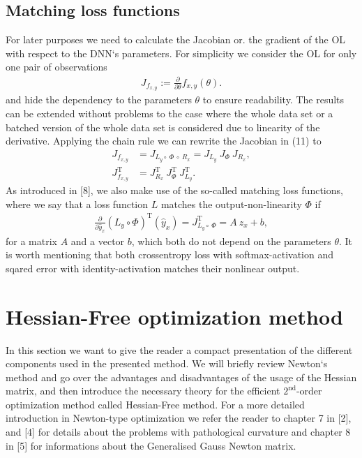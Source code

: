 \documentclass[conference]{IEEEtran}
\begin{document}
\subsection{Matching loss functions}
For later purposes we need to calculate the Jacobian or. the gradient of the OL with respect to the DNN`s parameters. For simplicity we consider the OL for only one pair of observations
\begin{align}
J_{f_{x, y}} := \frac{\partial}{\partial\theta}f_{x, y}(\theta).
\end{align}
and hide the dependency to the parameters $\theta$ to ensure readability.
The results can be extended without problems to the case where the whole data set or a batched version of the whole data set is considered due to linearity of the derivative.
Applying the chain rule we can rewrite the Jacobian in (11) to
\begin{align}
J_{f_{x, y}} &= J_{L_{y}\circ \:\Phi \:\circ\:R_{x}} = J_{L_{y}} \: J_{\Phi} \: J_{R_{x}},\\
J_{f_{x, y}}^{\mathrm{T}} &= J_{R_{x}}^{\mathrm{T}} \: J_{\Phi}^{\mathrm{T}} \: J_{L_{y}}^{\mathrm{T}}.
\end{align}
As introduced in [8], we also make use of the so-called matching loss functions, where we say that a loss function $L$ matches the output-non-linearity $\Phi$ if
\begin{align}
\frac{\partial}{\partial\hat{y}_{x}}\left(L_{y}\circ \Phi\right)^{\mathrm{T}}(\hat{y}_{x})= J_{L_{y}\circ \:\Phi}^{\mathrm{T}} = A\: z_{x} + b,
\end{align}
for a matrix $A$ and a vector $b$, which both do not depend on the parameters $\theta$.
It is worth mentioning that both crossentropy loss with softmax-activation and sqared error with identity-activation matches their nonlinear output. 


\section{Hessian-Free optimization method}
In this section we want to give the reader a compact presentation of the different components used in the presented method. We will briefly review Newton`s method and go over the advantages and disadvantages of the usage of the Hessian matrix, and then introduce the necessary theory for the efficient $2^{\text{nd}}$-order optimization method called Hessian-Free method. For a more detailed introduction in Newton-type optimization we refer the reader to chapter 7 in [2], and [4] for details about the problems with pathological curvature and chapter 8 in [5] for informations about the Generalised Gauss Newton matrix.
\end{document}
